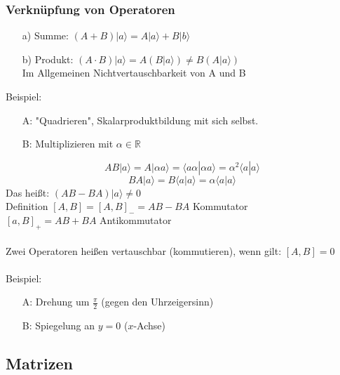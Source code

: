 \documentclass{article}
\begin{document}
\subsubsection{Verknüpfung von Operatoren}
\begin{itemize}
    \item[a)] Summe: $(A+B)|a\rangle = A|a\rangle + B|b\rangle$
    \item[b)] Produkt: $(A\cdot B)|a\rangle = A(B|a\rangle) \neq B(A|a\rangle)$\\Im Allgemeinen Nichtvertauschbarkeit von A und B
\end{itemize}
Beispiel:
\begin{itemize}
\item[A:] "Quadrieren", Skalarproduktbildung mit sich selbst.
\item[B:] Multiplizieren mit $\alpha \in \mathbb{R}$
\end{itemize}
\begin{equation*}
    AB|a\rangle = A|\alpha a\rangle = \langle a\alpha|\alpha a\rangle = \alpha^2 \langle a|a\rangle 
\end{equation*}
\begin{equation*}
    BA|a\rangle = B\langle a| a\rangle = \alpha \langle a|a\rangle 
\end{equation*}
Das heißt: $(AB-BA)|a\rangle \neq 0$\\
Definition $[A,B] = [A,B]_- = AB - BA$ Kommutator\\
\hspace*{2.9cm} $[a,B]_+ = AB + BA$ Antikommutator\\\\
Zwei Operatoren heißen vertauschbar (kommutieren), wenn gilt: $[A,B] = 0$\\\\
Beispiel:
\begin{itemize}
    \item[A:] Drehung um $\frac{\pi}{2}$ (gegen den Uhrzeigersinn)
    \item[B:] Spiegelung an $y = 0$ ($x$-Achse)
\end{itemize}

\subsection{Matrizen}
\end{document}
